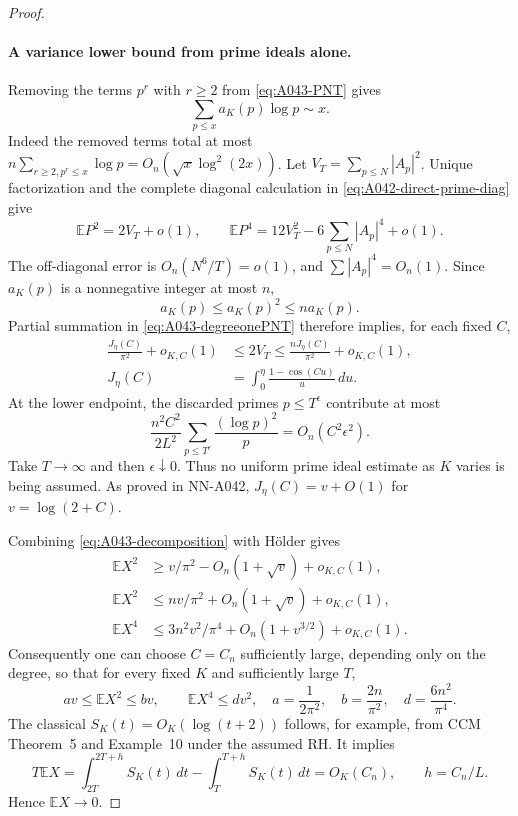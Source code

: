 \begin{proof}
\paragraph{A variance lower bound from prime ideals alone.}
Removing the terms $p^r$ with $r\ge2$ from
\eqref{eq:A043-PNT} gives
\begin{equation}\label{eq:A043-degreeonePNT}
 \sum_{p\le x}a_K(p)\log p\sim x.
\end{equation}
Indeed the removed terms total at most
$n\sum_{r\ge2,p^r\le x}\log p=O_n(\sqrt{x}\log^2(2x))$.
Let $V_T=\sum_{p\le N}|A_p|^2$. Unique factorization and
the complete diagonal calculation in
\eqref{eq:A042-direct-prime-diag} give
\[
 \mathbb EP^2=2V_T+o(1),\qquad
 \mathbb EP^4=12V_T^2-6\sum_{p\le N}|A_p|^4+o(1).
\]
The off-diagonal error is $O_n(N^6/T)=o(1)$, and
$\sum|A_p|^4=O_n(1)$.
Since $a_K(p)$ is a nonnegative integer at most $n$,
\[
                   a_K(p)\le a_K(p)^2\le n a_K(p).
\]
Partial summation in \eqref{eq:A043-degreeonePNT} therefore
implies, for each fixed $C$,
\begin{equation}\label{eq:A043-variancebounds}
 \begin{aligned}
 \frac{J_\eta(C)}{\pi^2}+o_{K,C}(1)
     &\le2V_T\le\frac{nJ_\eta(C)}{\pi^2}+o_{K,C}(1),\\
 J_\eta(C)&=\int_0^\eta\frac{1-\cos(Cu)}u\,du.
 \end{aligned}
\end{equation}
At the lower endpoint, the discarded primes $p\le T^\epsilon$
contribute at most
\[
 \frac{n^2C^2}{2L^2}\sum_{p\le T^\epsilon}
                          \frac{(\log p)^2}{p}
                   =O_n(C^2\epsilon^2).
\]
Take $T\to\infty$ and then
$\epsilon\downarrow0$. Thus no uniform prime ideal estimate
as $K$ varies is being assumed. As proved in NN-A042,
$J_\eta(C)=v+O(1)$ for $v=\log(2+C)$.

Combining \eqref{eq:A043-decomposition} with H\"older gives
\begin{align*}
 \mathbb EX^2&\ge v/\pi^2-O_n(1+\sqrt v)+o_{K,C}(1),\\
 \mathbb EX^2&\le nv/\pi^2+O_n(1+\sqrt v)+o_{K,C}(1),\\
 \mathbb EX^4&\le3n^2v^2/\pi^4+O_n(1+v^{3/2})+o_{K,C}(1).
\end{align*}
Consequently one can choose $C=C_n$ sufficiently large,
depending only on the degree, so that for every fixed $K$
and sufficiently large $T$,
\[
 av\le\mathbb EX^2\le bv,\qquad \mathbb EX^4\le dv^2,
 \quad a=\frac1{2\pi^2},\quad b=\frac{2n}{\pi^2},
 \quad d=\frac{6n^2}{\pi^4}.
\]
The classical $S_K(t)=O_K(\log(t+2))$ follows, for example,
from CCM Theorem~5 and Example~10 under the assumed RH.
It implies
\[
 T\mathbb EX=\int_{2T}^{2T+h}S_K(t)\,dt
                    -\int_T^{T+h}S_K(t)\,dt=O_K(C_n),
 \qquad h=C_n/L.
\]
Hence $\mathbb EX\to0$.


\end{proof}
